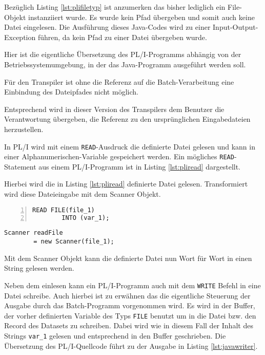 Bezüglich Listing \ref{lst:plifiletyp} ist anzumerken das bisher lediglich ein File-Objekt instanziiert wurde.
Es wurde kein Pfad übergeben und somit auch keine Datei eingelesen. 
Die Ausführung dieses Java-Codes wird zu einer Input-Output-Exception führen, da kein Pfad zu einer Datei übergeben wurde.

Hier ist die eigentliche Übersetzung des PL/I-Programms abhängig von der Betriebssystemumgebung, in der das Java-Programm ausgeführt werden soll.

Für den Transpiler ist ohne die Referenz auf die Batch-Verarbeitung eine Einbindung des Dateipfades nicht möglich.

Entsprechend wird in dieser Version des Transpilers dem Benutzer die Verantwortung übergeben, die Referenz zu den ursprünglichen Eingabedateien herzustellen.

In PL/I wird mit einem \verb+READ+-Ausdruck die definierte Datei gelesen und kann in einer Alphanumerischen-Variable gespeichert werden.
Ein mögliches \verb+READ+-Statement aus einem PL/I-Programm ist in Listing \ref{lst:pliread} dargestellt.

Hierbei wird die in Listing \ref{lst:pliread} definierte Datei gelesen.
Transformiert wird diese Dateieingabe mit dem Scanner Objekt.

\begin{minipage}[b]{0.48\linewidth}
	\centering
	\lstset{language=PL/I,label=SliceExaple}
	\begin{lstlisting}[frame=single, numbers=left, mathescape,%
		caption={Dateieingabe}, label={lst:pliread}]
		READ FILE(file_1) 
		INTO (var_1); 
	\end{lstlisting}
\end{minipage}
\hspace{0.5cm}
\begin{minipage}[b]{0.48\linewidth}
	\centering
	\lstset{language=Java,label=SliceExaple}
	\begin{lstlisting}[frame=single, mathescape,%
		title={" "}]
		Scanner readFile
		= new Scanner(file_1);
	\end{lstlisting}
\end{minipage}  


Mit dem Scanner Objekt kann die definierte Datei nun Wort für Wort in einen String gelesen werden.

Neben dem einlesen kann ein PL/I-Programm auch mit dem \verb+WRITE+ Befehl in eine Datei schreibe.
Auch hierbei ist zu erwähnen das die eigentliche Steuerung der Ausgabe durch das Batch-Programm vorgenommen wird.
Es wird in der Buffer, der vorher definierten Variable des Typs \verb+FILE+ benutzt um in die Datei bzw. den Record
des Datasets zu schreiben. Dabei wird wie in diesem Fall der Inhalt des Strings \verb+var_1+ gelesen und entsprechend
in den Buffer geschrieben.
Die Übersetzung des PL/I-Quellcode führt zu der Ausgabe in Listing \ref{lst:javawriter}.

